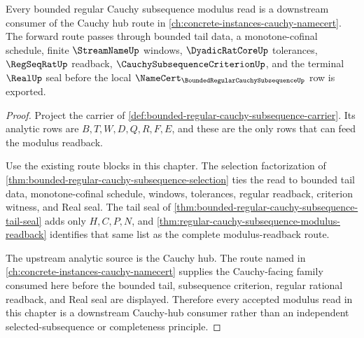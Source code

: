 \begin{theorem}
\label{thm:bounded-regular-cauchy-subsequence-cauchy-hub-forward-route}
Every bounded regular Cauchy subsequence modulus read is a downstream consumer of the Cauchy hub route in \autoref{ch:concrete-instances-cauchy-namecert}. The forward route passes through bounded tail data, a monotone-cofinal schedule, finite $\StreamNameUp$ windows, $\DyadicRatCoreUp$ tolerances, $\RegSeqRatUp$ readback, $\CauchySubsequenceCriterionUp$, and the terminal $\RealUp$ seal before the local $\NameCert_{\BoundedRegularCauchySubsequenceUp}$ row is exported.
\end{theorem}
\begin{proof}
Project the carrier of \autoref{def:bounded-regular-cauchy-subsequence-carrier}. Its analytic rows are $B,T,W,D,Q,R,F,E$, and these are the only rows that can feed the modulus readback.

Use the existing route blocks in this chapter. The selection factorization of \autoref{thm:bounded-regular-cauchy-subsequence-selection} ties the read to bounded tail data, monotone-cofinal schedule, windows, tolerances, regular readback, criterion witness, and Real seal. The tail seal of \autoref{thm:bounded-regular-cauchy-subsequence-tail-seal} adds only $H,C,P,N$, and \autoref{thm:regular-cauchy-subsequence-modulus-readback} identifies that same list as the complete modulus-readback route.

The upstream analytic source is the Cauchy hub. The route named in \autoref{ch:concrete-instances-cauchy-namecert} supplies the Cauchy-facing family consumed here before the bounded tail, subsequence criterion, regular rational readback, and Real seal are displayed. Therefore every accepted modulus read in this chapter is a downstream Cauchy-hub consumer rather than an independent selected-subsequence or completeness principle.
\end{proof}


